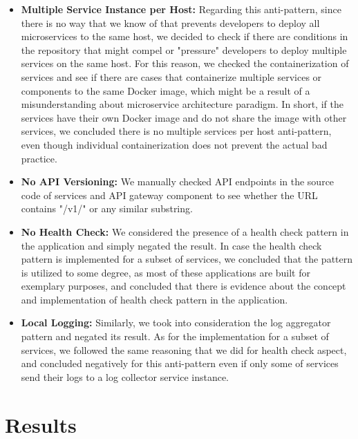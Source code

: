 \documentclass{Configuration_Files/PoliMi3i_thesis}
\begin{document}
\begin{itemize}
\begin{itemize}
        \item \textbf{Multiple Service Instance per Host:} Regarding this anti-pattern, since there is no way that we know of that prevents developers to deploy all microservices to the same host, we decided to check if there are conditions in the repository that might compel or "pressure" developers to deploy multiple services on the same host.
        For this reason, we checked the containerization of services and see if there are cases that containerize multiple services or components to the same Docker image, which might be a result of a misunderstanding about microservice architecture paradigm.
        In short, if the services have their own Docker image and do not share the image with other services, we concluded there is no multiple services per host anti-pattern, even though individual containerization does not prevent the actual bad practice.
        
        \item \textbf{No API Versioning:} We manually checked API endpoints in the source code of services and API gateway component to see whether the URL contains "/v1/" or any similar substring.
        
        \item \textbf{No Health Check:} We considered the presence of a health check pattern in the application and simply negated the result.
        In case the health check pattern is implemented for a subset of services, we concluded that the pattern is utilized to some degree, as most of these applications are built for exemplary purposes, and concluded that there is evidence about the concept and implementation of health check pattern in the application.
        
        \item \textbf{Local Logging:} Similarly, we took into consideration the log aggregator pattern and negated its result.
        As for the implementation for a subset of services, we followed the same reasoning that we did for health check aspect,
        and concluded negatively for this anti-pattern even if only some of services send their logs to a log collector service instance.
    \end{itemize}
\end{itemize}


\chapter{Results}
\label{ch:results}%
\end{document}
